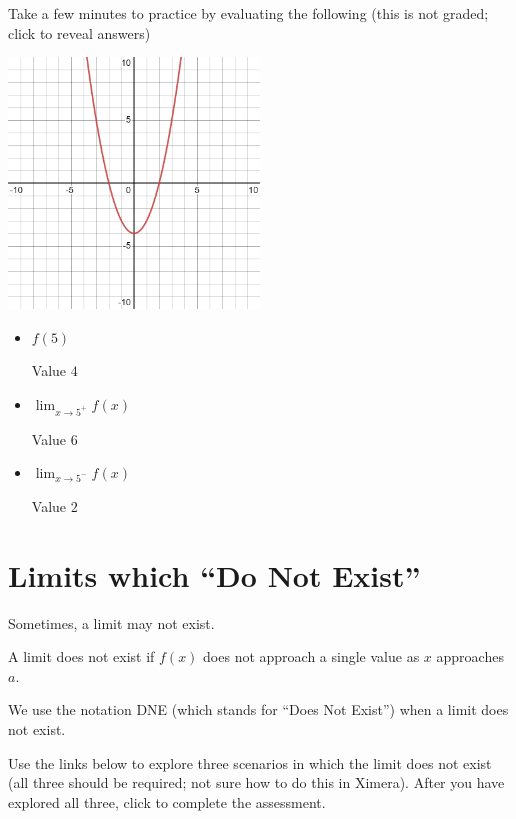 \documentclass{ximera}
\begin{document}
Take a few minutes to practice by evaluating the following (this is not graded; click to reveal answers)

\includegraphics[width=0.5\textwidth]{graph2.png}

\begin{itemize}
    \item $f(5)$
    \begin{expandable}
        Value $4$
    \end{expandable}
    \item $\lim_{x \to 5^+} f(x)$
    \begin{foldable}
        Value $6$
    \end{foldable}
    \item $\lim_{x \to 5^-} f(x)$
    \begin{expandable}
        Value $2$
    \end{expandable}
\end{itemize}

\section{Limits which ``Do Not Exist''}

Sometimes, a limit may not exist.

\begin{explanation}
    A limit does not exist if $f(x)$ does not approach a single value as $x$ approaches $a$.
\end{explanation}

We use the notation DNE (which stands for ``Does Not Exist'') when a limit does not exist.

Use the links below to explore three scenarios in which the limit does not exist (all three should be required; not sure how to do this in Ximera). After you have explored all three, click to complete the assessment.
\end{document}
